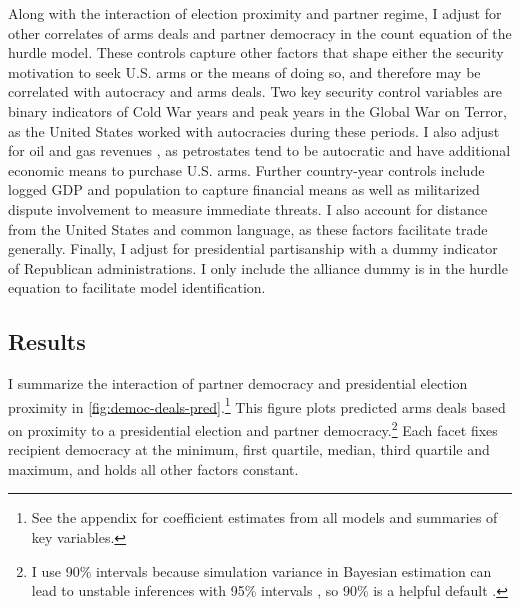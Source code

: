 \documentclass[12pt]{article}
\begin{document}
Along with the interaction of election proximity and partner regime, I adjust for other correlates of arms deals and partner democracy in the count equation of the hurdle model. 
These controls capture other factors that shape either the security motivation to seek U.S. arms or the means of doing so, and therefore may be correlated with autocracy and arms deals. 
Two key security control variables are binary indicators of Cold War years and peak years in the Global War on Terror, as the United States worked with autocracies during these periods. 
I also adjust for oil and gas revenues \citep{RossMahdavi2015}, as petrostates tend to be autocratic and have additional economic means to purchase U.S. arms.
Further country-year controls include logged GDP and population to capture financial means as well as militarized dispute involvement to measure immediate threats.
I also account for distance from the United States and common language, as these factors facilitate trade generally. 
Finally, I adjust for presidential partisanship with a dummy indicator of Republican administrations.  
I only include the alliance dummy is in the hurdle equation to facilitate model identification.


\subsection{Results}


I summarize the interaction of partner democracy and presidential election proximity in \autoref{fig:democ-deals-pred}.\footnote{See the appendix for coefficient estimates from all models and summaries of key variables.}
This figure plots predicted arms deals based on proximity to a presidential election and partner democracy.\footnote{I use 90\% intervals because simulation variance in Bayesian estimation can lead to unstable inferences with 95\% intervals \citep{McElreath2016}, so 90\% is a helpful default \citep{Goodrichetal2023}.}
Each facet fixes recipient democracy at the minimum, first quartile, median, third quartile and maximum, and holds all other factors constant.
\end{document}
